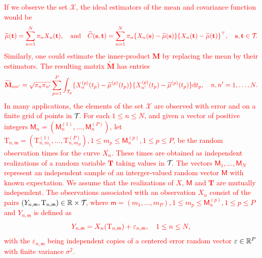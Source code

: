 \textcolor{red}{If we observe the set $\mathcal{X}$, the ideal estimators of the mean and covariance function would be}
\begin{equation}\label{eq:perfect_estimator}
    \textcolor{red}{\widetilde{\mu}(\mathbf{t}) = \sum_{n = 1}^N \pi_n X_n(\mathbf{t}), \quad\text{and}\quad \widetilde{C}(\mathbf{s}, \mathbf{t}) =  \sum_{n = 1}^N \pi_n \{X_n(\mathbf{s}) - \widetilde{\mu}(\mathbf{s})\}\{X_n(\mathbf{t}) - \widetilde{\mu}(\mathbf{t})\}^\top, \quad \mathbf{s}, \mathbf{t} \in \mathcal{T}_{}.}
\end{equation}
\textcolor{red}{Similarly, one could estimate the inner-product $\mathbf{M}$ by replacing the mean by their estimators. The resulting matrix $\widetilde{\mathbf{M}}$ has entries}
\begin{equation}\label{eq:perfect_gram_estimator}
    \textcolor{red}{\widetilde{\mathbf{M}}_{nn^\prime} = \sqrt{\pi_n \pi_{n^{\prime}}}\sum_{p = 1}^P \int_{\mathcal{T}_{p}}\{X_n^{(p)}(t_p) - \widetilde{\mu}^{(p)}(t_p)\}\{X_{n^\prime}^{(p)}(t_p) - \widetilde{\mu}^{(p)}(t_p)\} {\rm d} t_p, \quad n, n^\prime = 1, \dots, N.}
\end{equation}
\textcolor{red}{In many applications, the elements of the set $\mathcal{X}$ are observed with error and on a finite grid of points in $\mathcal{T}_{}$. For each $1 \leq n \leq N$, and given a vector of positive integers $\mathsf{M}_n = (\mathsf{M}_n^{(1)}, \dots, \mathsf{M}_n^{(P)})$, let $\mathrm{T}_{n, \mathsf{m}} = (\mathrm{T}_{n, m_1}^{(1)}, \dots, \mathrm{T}_{n, m_P}^{(P)}), 1 \leq m_p \leq \mathsf{M}_n^{(p)}, 1 \leq p \leq P$, be the random observation times for the curve $X_n$. These times are obtained as independent realizations of a random variable $\mathbf{T}$ taking values in $\mathcal{T}_{}$. The vectors $\mathsf{M}_1, \dots, \mathsf{M}_N$ represent an independent sample of an interger-valued random vector $\mathsf{M}$ with known expectation. We assume that the realizations of $X$, $\mathsf{M}$ and $\mathbf{T}$ are mutually independent. The observations associated with an observation $X_n$ consist of the pairs $(Y_{n, \mathsf{m}}, \mathrm{T}_{n, \mathsf{m}}) \in \mathbb{R} \times \mathcal{T}_{}$, where $\mathsf{m} = (m_1, \dots, m_P), 1 \leq m_p \leq \mathsf{M}_n^{(p)}, 1 \leq p \leq P$ and $Y_{n, \mathsf{m}}$ is defined as}
\begin{equation}\label{eq:model_error}
    \textcolor{red}{Y_{n, \mathsf{m}} = X_n(\mathrm{T}_{n, \mathsf{m}}) + \varepsilon_{n, \mathsf{m}}, \quad 1 \leq n \leq N,}
\end{equation}
\textcolor{red}{with the $\varepsilon_{n, \mathsf{m}}$ being independent copies of a centered error random vector $\varepsilon \in \mathbb{R}^{P}$ with finite variance $\sigma^2$.}

